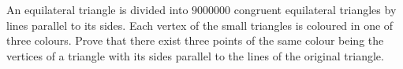 An equilateral triangle is divided into $9000000$ congruent equilateral triangles by lines parallel to its sides. Each vertex of the small triangles is coloured in one of three colours. Prove that there exist three points of the same colour being the vertices of a triangle with its sides parallel to the lines of the original triangle.